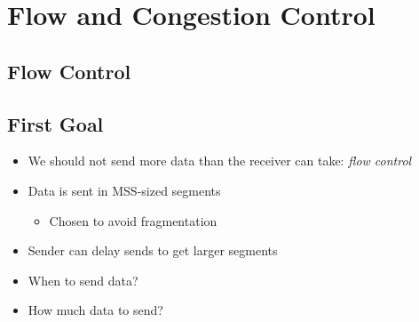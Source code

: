 \section{Flow and Congestion Control}
\subsection{Flow Control}
\subsection{First Goal}
\begin{itemize}[nosep]
    \item We should not send more data than the receiver can take: \emph{flow control}
    \item Data is sent in MSS-sized segments
          \begin{itemize}[nosep]
              \item Chosen to avoid fragmentation
          \end{itemize}
    \item Sender can delay sends to get larger segments
    \item When to send data?
    \item How much data to send?
\end{itemize}
